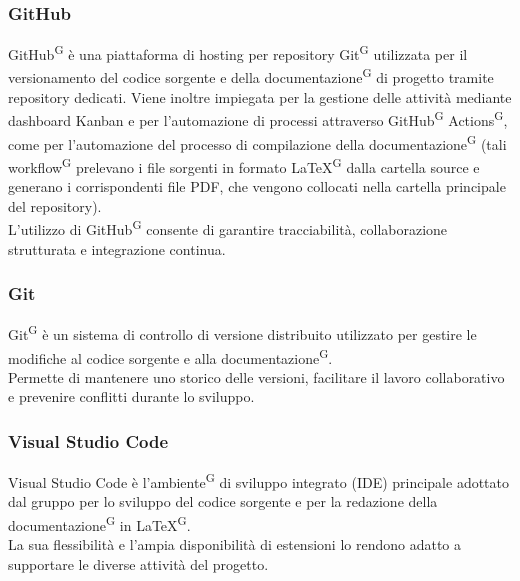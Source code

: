 \documentclass[a4paper, 11pt]{article}
\begin{document}
\subsubsection{GitHub}
GitHub\textsuperscript{G} è una piattaforma di hosting per repository Git\textsuperscript{G} utilizzata per il versionamento del codice sorgente e della documentazione\textsuperscript{G} di progetto 
tramite repository dedicati. Viene inoltre impiegata per la gestione delle attività mediante dashboard Kanban e per l'automazione di processi 
attraverso GitHub\textsuperscript{G} Actions\textsuperscript{G}, come per l'automazione del processo di compilazione della documentazione\textsuperscript{G} (tali workflow\textsuperscript{G} prelevano i file sorgenti 
in formato LaTeX\textsuperscript{G} dalla cartella source e generano i corrispondenti file PDF, che vengono collocati nella cartella principale del repository).\\
L'utilizzo di GitHub\textsuperscript{G} consente di garantire tracciabilità, collaborazione strutturata e integrazione continua.
\subsubsection{Git}
Git\textsuperscript{G} è un sistema di controllo di versione distribuito utilizzato per gestire le modifiche al codice sorgente e alla documentazione\textsuperscript{G}.\\
Permette di mantenere uno storico delle versioni, facilitare il lavoro collaborativo e prevenire conflitti durante lo sviluppo.
\subsubsection{Visual Studio Code}
Visual Studio Code è l'ambiente\textsuperscript{G} di sviluppo integrato (IDE) principale adottato dal gruppo per lo sviluppo del codice sorgente e per la redazione della documentazione\textsuperscript{G} in LaTeX\textsuperscript{G}. \\
La sua flessibilità e l'ampia disponibilità di estensioni lo rendono adatto a supportare le diverse attività del progetto.
\end{document}
